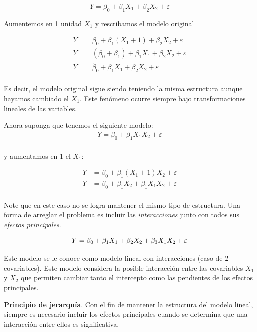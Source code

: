 \documentclass[
  12pt,
]{book}
\begin{document}
\begin{equation*}
Y = \beta_{0} + \beta_{1} X_{1} + \beta_{2} X_{2} + \varepsilon
\end{equation*}

Aumentemos en 1 unidad \(X_{1}\) y rescribamos el modelo original

\begin{align*}
Y &=  \beta_{0} + \beta_{1} (X_{1}+1) + \beta_{2} X_{2} + \varepsilon \\
Y &=  (\beta_{0} + \beta_{1}) + \beta_{1} X_{1} + \beta_{2} X_{2} + \varepsilon \\
Y &=  \tilde{\beta_{0}} + \beta_{1} X_{1} + \beta_{2} X_{2} + \varepsilon \\
\end{align*}

Es decir, el modelo original sigue siendo teniendo la misma estructura
aunque hayamos cambiado el \(X_1\). Este fenómeno ocurre siempre bajo
transformaciones lineales de las variables.

Ahora suponga que tenemos el siguiente modelo: \begin{align*}
Y =  \beta_{0} + \beta_{1} X_{1} X_{2} +\varepsilon \\
\end{align*}

y aumentamos en 1 el \(X_1\):

\begin{align*}
Y &=  \beta_{0} + \beta_{1} (X_{1}+1) X_{2} +\varepsilon \\
Y &=  \beta_{0} + \beta_{1}X_{2} +  \beta_{1} X_{1} X_{2} +\varepsilon \\
\end{align*}

Note que en este caso no se logra mantener el mismo tipo de estructura.
Una forma de arreglar el problema es incluir las \emph{interacciones}
junto con todos sus \emph{efectos principales}.

\begin{equation*}
Y =  \beta_{0} + \beta_{1}X_{1} + \beta_{2} X_{2} +  \beta_{3} X_{1} X_{2} +\varepsilon \\
\end{equation*}

Este modelo se le conoce como modelo lineal con interacciones (caso de 2
covariables). Este modelo considera la posible interacción entre las
covariables \(X_1\) y \(X_2\) que permiten cambiar tanto el intercepto
como las pendientes de los efectos principales.

\textbf{Principio de jerarquía}. Con el fin de mantener la estructura
del modelo lineal, siempre es necesario incluir los efectos principales
cuando se determina que una interacción entre ellos es significativa.
\end{document}
